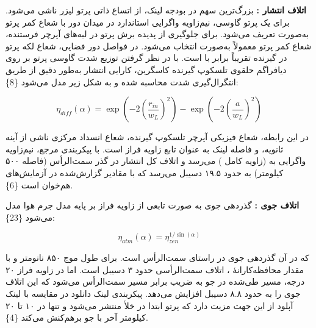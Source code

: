 \documentclass[a4paper,14pt]{extreport}
\begin{document}
\textbf{اتلاف انتشار :} بزرگ‌ترین سهم در بودجه لینک، از اتساع  ذاتی پرتو لیزر ناشی می‌شود. برای یک پرتو گاوسی، نیم‌زاویه واگرایی استاندارد در میدان دور با شعاع کمر پرتو  به‌صورت  تعریف می‌شود. برای جلوگیری از پدیده برش پرتو  در لبه‌های آپرچر فرستنده، شعاع کمر پرتو معمولاً به‌صورت  انتخاب می‌شود. در فواصل دور فضایی، شعاع لکه پرتو  در گیرنده تقريباً برابر با  است. با در نظر گرفتن توزیع شدت گاوسی پرتو بر روی دیافراگم حلقوی تلسکوپ گیرنده کاسگرین، کارایی انتشار به‌طور دقیق از طریق انتگرال‌گیری شدت محاسبه شده و به شکل زیر مدل می‌شود \{8\}:

\begin{equation}
\eta_{diff}(\alpha) = \exp\left(-2\left(\frac{r_{in}}{w_L}\right)^2\right) - \exp\left(-2\left(\frac{a}{w_L}\right)^2\right)
\label{eq:diff_loss}
\end{equation}

در این رابطه،  شعاع فیزیکی آپرچر  تلسکوپ گیرنده،  شعاع انسداد مرکزی  ناشی از آینه ثانویه، و  فاصله لینک به عنوان تابع زاویه فراز است. با پیکربندی مرجع، نیم‌زاویه واگرایی به  (زاویه کامل ) می‌رسد و اتلاف کل انتشار در گذر سمت‌الرأس (فاصله ۵۰۰ کیلومتر) به حدود ۱۹.۵ دسیبل می‌رسد که با مقادیر گزارش‌شده در آزمایش‌های  هم‌خوان است \{6\}.

\textbf{اتلاف جوی :} گذردهی جوی  به صورت تابعی از زاویه فراز بر پایه مدل جرم هوا  مدل می‌شود \{23\}:

\begin{equation}
\eta_{atm}(\alpha) = \eta_{zen}^{1/\sin(\alpha)}
\label{eq:atm_eta}
\end{equation}

که در آن  گذردهی جوی در راستای سمت‌الرأس است. برای طول موج ۸۵۰ نانومتر و با مقدار محافظه‌کارانهٔ ، اتلاف سمت‌الرأسی حدود ۳ دسیبل است. اما در زاویه فراز ۲۰ درجه، مسیر طی‌شده در جو به ضریب  برابر مسیر سمت‌الرأس می‌شود که این اتلاف جوی را به حدود ۸.۸ دسیبل افزایش می‌دهد. پیکربندی لینک دانلود  در مقایسه با لینک آپلود  از این جهت مزیت دارد که پرتو ابتدا در خلأ منتشر می‌شود و تنها در ۱۰ تا ۲۰ کیلومتر آخر با جو برهم‌کنش می‌کند \{4\}.
\end{document}
